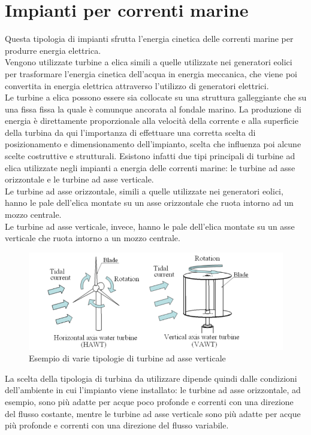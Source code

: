 \section{Impianti per correnti marine}
Questa tipologia di impianti sfrutta l'energia cinetica delle correnti marine per produrre energia elettrica.\\
Vengono utilizzate turbine a elica simili a quelle utilizzate nei generatori eolici per trasformare l'energia cinetica dell'acqua in energia meccanica, che viene poi convertita in energia elettrica attraverso l'utilizzo di generatori elettrici.\\
Le turbine a elica possono essere sia collocate su una struttura galleggiante che su una fissa fissa la quale è comunque ancorata al fondale marino.
La produzione di energia è direttamente proporzionale alla velocità della corrente e alla superficie della turbina da qui l'importanza di effettuare una corretta scelta di posizionamento e dimensionamento dell'impianto, scelta che influenza poi alcune scelte costruttive e strutturali.
Esistono infatti due tipi principali di turbine ad elica utilizzate negli impianti a energia delle correnti marine: le turbine ad asse orizzontale e le turbine ad asse verticale.\\
Le turbine ad asse orizzontale, simili a quelle utilizzate nei generatori eolici, hanno le pale dell'elica montate su un asse orizzontale che ruota intorno ad un mozzo centrale.\\
Le turbine ad asse verticale, invece, hanno le pale dell'elica montate su un asse verticale che ruota intorno a un mozzo centrale.\\
\begin{figure}[H]
    \centering
    \includegraphics[height=0.4\textwidth]{res/cap 3/Ocean current turbine}
    \caption{Esempio di varie tipologie di turbine ad asse verticale\cite{Ocean_current_turbine}}
\end{figure}\noindent
La scelta della tipologia di turbina da utilizzare dipende quindi dalle condizioni dell'ambiente in cui l'impianto viene installato: le turbine ad asse orizzontale, ad esempio, sono più adatte per acque poco profonde e correnti con una direzione del flusso costante, mentre le turbine ad asse verticale sono più adatte per acque più profonde e correnti con una direzione del flusso variabile.\\
